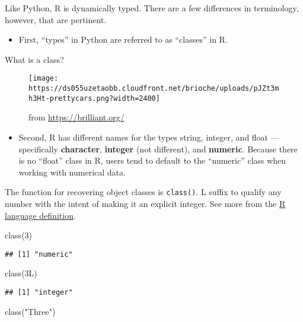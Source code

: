 \documentclass[
]{book}
\newenvironment{Shaded}{\begin{snugshade}}{\end{snugshade}}
\newcommand{\DecValTok}[1]{\textcolor[rgb]{0.00,0.00,0.81}{#1}}
\newcommand{\FunctionTok}[1]{\textcolor[rgb]{0.00,0.00,0.00}{#1}}
\newcommand{\NormalTok}[1]{#1}
\newcommand{\StringTok}[1]{\textcolor[rgb]{0.31,0.60,0.02}{#1}}
\providecommand{\tightlist}{%
  \setlength{\itemsep}{0pt}\setlength{\parskip}{0pt}}
\begin{document}
Like Python, R is dynamically typed. There are a few differences in terminology, however, that are pertinent.

\begin{itemize}
\tightlist
\item
  First, ``types'' in Python are referred to as ``classes'' in R.
\end{itemize}

What is a class?

\begin{figure}
\centering
\texttt{[image: https://ds055uzetaobb.cloudfront.net/brioche/uploads/pJZt3mh3Ht-prettycars.png?width=2400]}
\caption{from \url{https://brilliant.org/}}
\end{figure}

\begin{itemize}
\tightlist
\item
  Second, R has different names for the types string, integer, and float --- specifically \textbf{character}, \textbf{integer} (not different), and \textbf{numeric}. Because there is no ``float'' class in R, users tend to default to the ``numeric'' class when working with numerical data.
\end{itemize}

The function for recovering object classes is \texttt{class()}. L suffix to qualify any number with the intent of making it an explicit integer. See more from the \href{https://cran.r-project.org/doc/manuals/R-lang.html}{R language definition}.

\begin{Shaded}
\begin{Highlighting}[]
\FunctionTok{class}\NormalTok{(}\DecValTok{3}\NormalTok{)}
\end{Highlighting}
\end{Shaded}

\begin{verbatim}
## [1] "numeric"
\end{verbatim}

\begin{Shaded}
\begin{Highlighting}[]
\FunctionTok{class}\NormalTok{(3L)}
\end{Highlighting}
\end{Shaded}

\begin{verbatim}
## [1] "integer"
\end{verbatim}

\begin{Shaded}
\begin{Highlighting}[]
\FunctionTok{class}\NormalTok{(}\StringTok{"Three"}\NormalTok{)}
\end{Highlighting}
\end{Shaded}
\end{document}
